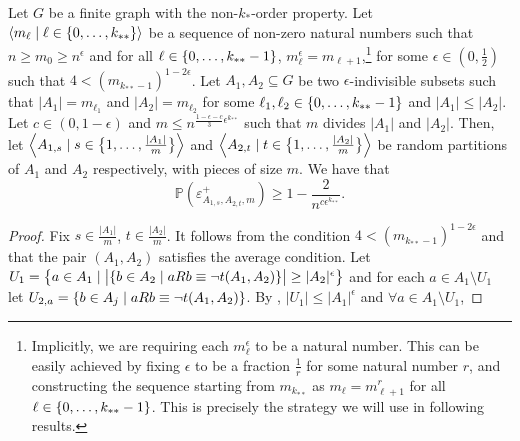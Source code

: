         \begin{lemma} \label{lem:bound_on_the_probability_of_a_subpair_having_no_exceptions}
            Let $G$ be a finite graph with the non-$k_{*}$-order property.
            \sloppy Let $\left< m_\ell \mid \ell \in \{ 0, \dots, k_{**} \} \right>$ be a sequence of non-zero natural numbers such that
            $n \geq m_0 \geq n^\epsilon$ and for all $\ell \in \{ 0, \dots, k_{**}-1 \}$,
            $m_\ell^\epsilon = m_{\ell+1}$,\footnote{
                Implicitly, we are requiring each $m_\ell^\epsilon$ to be a natural number.
                This can be easily achieved by fixing $\epsilon$ to be a fraction $\frac{1}{r}$ for some natural number
                $r$, and constructing the sequence starting from $m_{k_{**}}$ as $m_\ell = m_{\ell+1}^r$ for all
                $\ell \in \{ 0, \dots, k_{**}-1 \}$.
                This is precisely the strategy we will use in following results.}
            for some $\epsilon \in (0, \frac{1}{2})$ such that $4 < (m_{k_{**}-1})^{1-2\epsilon}$.
            Let $A_1, A_2 \subseteq G$ be two $\epsilon$-indivisible subsets such that $|A_1| = m_{\ell_1}$ and $|A_2| = m_{\ell_2}$
            for some $\ell_1, \ell_2 \in \{ 0, \dots, k_{**}-1 \}$ and $|A_1| \leq |A_2|$.
            Let $c \in (0, 1-\epsilon)$ and $m \leq n^{\frac{1 - \epsilon - c}{3}\epsilon^{k_{**}}}$ such that $m$ divides $|A_1|$ and $|A_2|$.
            Then, let $\left< A_{1,s} \mid s \in \bigl\{ 1, \dots, \frac{|A_1|}{m} \bigr\} \right>$ and
            $\left< A_{2,t} \mid t \in \bigl\{ 1, \dots, \frac{|A_2|}{m} \bigr\} \right>$ be random partitions of $A_1$ and $A_2$
            respectively, with pieces of size $m$.
            We have that
            \[
                \mathbb{P}(\varepsilon^+_{A_{1,s},A_{2,t},m}) \geq 1 - \frac{2}{n^{c\epsilon^{k_{**}}}}.
            \]
            \begin{proof}
                Fix $s \in \frac{|A_1|}{m}$, $t \in \frac{|A_2|}{m}$.
                It follows from the condition $4 < (m_{k_{**}-1})^{1-2\epsilon}$ and 
                that the pair $(A_{1}, A_{2})$ satisfies the average condition.
                Let $U_1 = \bigl\{ a \in A_1 \mid \bigl| \{ b \in A_2 \mid a R b \equiv \neg t(A_1, A_2) \} \bigr| \geq |A_2|^\epsilon \bigr\}$
                and for each $a \in A_1 \setminus U_1$ let $U_{2,a} = \{ b \in A_j \mid a R b \equiv \neg t(A_1, A_2) \}$.
                By , $|U_1| \leq |A_1|^\epsilon$ and $\forall a \in A_1 \setminus U_1$,

\end{proof}
\end{lemma}
